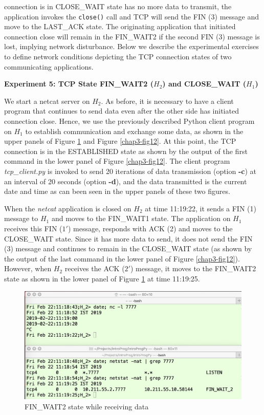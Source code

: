 \begin{multicols}{2}
\noindent
connection is in CLOSE\_WAIT state has no more data to transmit, the application invokes the \lstinline|close()| call and TCP will send the FIN (3) message and move to the LAST\_ACK state. The originating application that initiated connection close will remain in the FIN\_WAIT2 if the second FIN (3) message is lost, implying network disturbance. Below we describe the experimental exercises to define network conditions depicting the TCP connection states of two communicating applications.

\medskip
\noindent
\textbf{Experiment 5: TCP State FIN\_WAIT2 (\boldmath$H_{2}$) and CLOSE\_WAIT ($H_{1}$)}
\smallskip

We start a netcat server on $H_{2}$. As before, it is necessary to have a client program that continues to send data even after the other side has initiated connection close. Hence, we use the previously described Python client program on $H_{1}$ to establish communication and exchange some data, as shown in the upper panels of Figure \ref{chap3-fig11} and Figure \ref{chap3-fig12}. At this point, the TCP connection is in the ESTABLISHED state as shown by the output of the first command in the lower panel of Figure \ref{chap3-fig12}. The client program \textit{tcp\_client.py} is invoked to send 20 iterations of data transmission (option \textbf{-c}) at an interval of 20 seconds (option \textbf{-d}), and the data transmitted is the current date and time as can been seen in the upper panels of these two figures.

When the \textit{netcat} application is closed on $H_{2}$ at time 11:19:22, it sends a FIN (1) message to $H_{1}$ and moves to the FIN\_WAIT1 state. The application on $H_{1}$ receives this FIN ($1'$) message, responds with ACK (2) and moves to the CLOSE\_WAIT state. Since it has more data to send, it does not send the FIN (3) message and continues to remain in the CLOSE\_WAIT state (as shown by the output of the last command in the lower panel of Figure \ref{chap3-fig12}). However, when $H_{2}$ receives the ACK ($2'$) message, it moves to the FIN\_WAIT2 state as shown in the lower panel of Figure \ref{chap3-fig11} at time 11:19:25.
\end{multicols}

\begin{figure}[!htb]
\centering
\includegraphics[scale=.23]{src/Figures/chap3/11.jpg}
\caption{FIN\_WAIT2 state while receiving data}\label{chap3-fig11}
\end{figure}

